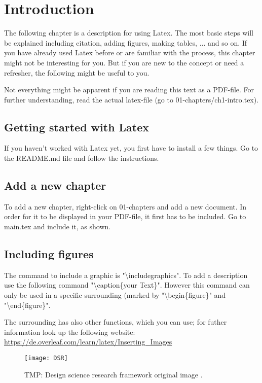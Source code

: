 \chapter{Introduction \label{ch1-intro}}

The following chapter is a description for using Latex. The most basic steps will be explained including citation, adding figures, making tables, ... and so on. If you have already used Latex before or are familiar with the process, this chapter might not be interesting for you. But if you are new to the concept or need a refresher, the following might be useful to you.

Not everything might be apparent if you are reading this text as a PDF-file. For further understanding, read the actual latex-file (go to 01-chapters/ch1-intro.tex).

\section{Getting started with Latex}

If you haven't worked with Latex yet, you first have to install a few things. Go to the README.md file and follow the instructions.

\section{Add a new chapter}

To add a new chapter, right-click on 01-chapters and add a new document. In order for it to be displayed in your PDF-file, it first has to be included. Go to main.tex and include it, as shown.


\section{Including figures}

The command to include a graphic is "\textbackslash includegraphics". To add a description use the following command "\textbackslash caption\{your Text\}". However this command can only be used in a specific surrounding (marked by "\textbackslash begin\{figure\}" and "\textbackslash end\{figure\}".

The surrounding has also other functions, which you can use; for futher information look up the following website: \url{https://de.overleaf.com/learn/latex/Inserting_Images}


\begin{figure}[ht]
	\centering
	\texttt{[image: DSR]}
	\caption{TMP: Design science research framework original image \cite[based on][p. 80]{HEVN04}.}
	\label{fig:DSR}
\end{figure}



